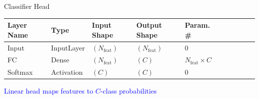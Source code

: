 \documentclass[aspectratio=169]{beamer}
\begin{document}
\begin{frame}{Classifier Head}

\begin{table}
\begin{tabularx}{\linewidth}{p{2.6cm}p{3.5cm}p{2.6cm}p{2.8cm}p{2.6cm}lcccc}
\toprule
\textbf{Layer Name} & \textbf{Type} & \textbf{Input Shape} & \textbf{Output Shape} & \textbf{Param. \#} \\
\midrule
Input   & InputLayer & $(N_{\text{feat}})$ & $(N_{\text{feat}})$ & $0$ \\
FC      & Dense      & $(N_{\text{feat}})$ & $(C)$               & $N_{\text{feat}}\!\times\! C$ \\
Softmax & Activation & $(C)$               & $(C)$               & $0$ \\
\midrule

\end{tabularx}
\end{table}

\begin{center}
\textcolor{blue}{Linear head maps features to $C$-class probabilities}
\end{center}
\end{frame}
\end{document}
